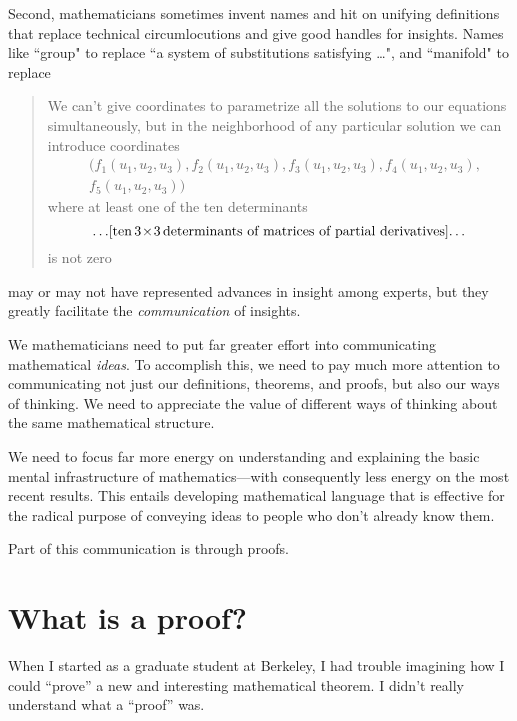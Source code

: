 \documentclass[12pt]{amsart}
\begin{document}
Second, mathematicians sometimes invent names
and hit on unifying definitions that replace technical
circumlocutions and give good handles for insights.  
Names like ``group" to replace ``a system of substitutions 
satisfying \dots", 
and ``manifold" to replace 
\begin{quote}
We can't give coordinates to
parametrize all the solutions to our equations 
simultaneously,
but in the neighborhood of any particular solution we can 
introduce
coordinates
\begin{equation*}
\begin{aligned}
&(f_1(u_1,u_2,u_3), f_2(u_1,u_2,u_3), f_3(u_1,u_2,u_3), 
f_4(u_1,u_2,u_3),\\
&f_5(u_1,u_2,u_3))\end{aligned}\end{equation*}
where at least one of the ten determinants 
$$ \dots\! \text{[ten \!$3\!\times\!3$ \!determinants 
of matrices of partial derivatives]} \!\dots 
$$
is not zero
\end{quote}
may or may not have represented advances in insight among 
experts,
but they greatly facilitate the {\it communication} of 
insights.

\bigskip

We mathematicians need to put far greater effort into 
communicating mathematical {\it ideas}.
To accomplish this, we need to pay much more attention to 
communicating
not just our definitions, theorems, and proofs, but also
our ways of thinking.  We need to appreciate the value of 
different ways
of thinking about the same mathematical structure.

We need to focus far more
energy on understanding and explaining
the basic mental infrastructure of mathematics---with 
consequently
less energy on the most recent results.   This entails 
developing
mathematical language that is effective for the radical 
purpose of
conveying ideas to people who don't already know them.

Part of this communication is through proofs.

\section{What is a proof?}

When I started as a graduate student at Berkeley, I had 
trouble imagining
how I could ``prove'' a new and interesting mathematical 
theorem.
I didn't really understand what a ``proof'' was.
\end{document}
